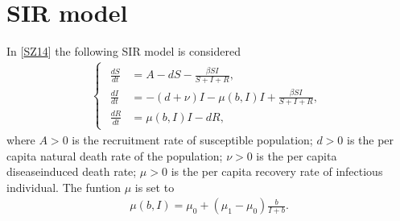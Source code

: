 \documentclass[letterpaper,10pt,english]{jupyterBook}
\begin{document}
\chapter{SIR model}
\label{\detokenize{SIRmodel:sir-model}}\label{\detokenize{SIRmodel::doc}}
\sphinxAtStartPar
In {[}\hyperlink{cite.references:id20}{SZ14}{]} the following SIR model is considered
\begin{equation*}
\begin{split}
\begin{cases}
\begin{aligned}
    \frac{d S}{d t} &=A-d S-\frac{\beta S I}{S+I+R}, \\ 
    \frac{d I}{d t} &=-(d+\nu) I-\mu(b,I) I+\frac{\beta S I}{S+I+R}, \\ 
    \frac{d R}{d t} &=\mu(b,I) I-d R,
\end{aligned}
\end{cases}
\end{split}
\end{equation*}
\sphinxAtStartPar
where \(A>0\) is the recruitment rate of susceptible population;
\(d>0\) is the per capita natural death rate of the population; \(\nu>0\) is
the per capita disease\sphinxhyphen{}induced death rate; \(\mu>0\) is the per capita
recovery rate of infectious individual. The funtion \(\mu\) is set to
\begin{equation*}
\begin{split}
\mu(b,I) = \mu_0 + (\mu_1 - \mu_0) \frac{b}{I+b}.
\end{split}
\end{equation*}
\end{document}
